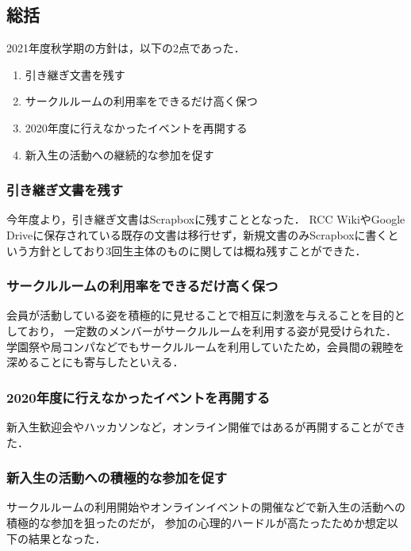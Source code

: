 \subsection*{\thirdGrade{}総括}



2021年度秋学期の\thirdGrade{}方針は，以下の2点であった．

\begin{enumerate}
    \item 引き継ぎ文書を残す
    \item サークルルームの利用率をできるだけ高く保つ
    \item 2020年度に行えなかったイベントを再開する
    \item 新入生の活動への継続的な参加を促す
\end{enumerate}


\subsubsection{引き継ぎ文書を残す}

今年度より，引き継ぎ文書はScrapboxに残すこととなった．
RCC WikiやGoogle Driveに保存されている既存の文書は移行せず，新規文書のみScrapboxに書くという方針としており3回生主体のものに関しては概ね残すことができた．

\subsubsection{サークルルームの利用率をできるだけ高く保つ}

会員が活動している姿を積極的に見せることで相互に刺激を与えることを目的としており，
一定数のメンバーがサークルルームを利用する姿が見受けられた．
学園祭や局コンパなどでもサークルルームを利用していたため，会員間の親睦を深めることにも寄与したといえる．

\subsubsection{2020年度に行えなかったイベントを再開する}

新入生歓迎会やハッカソンなど，オンライン開催ではあるが再開することができた．

\subsubsection{新入生の活動への積極的な参加を促す}

サークルルームの利用開始やオンラインイベントの開催などで新入生の活動への積極的な参加を狙ったのだが，
参加の心理的ハードルが高たったためか想定以下の結果となった．
